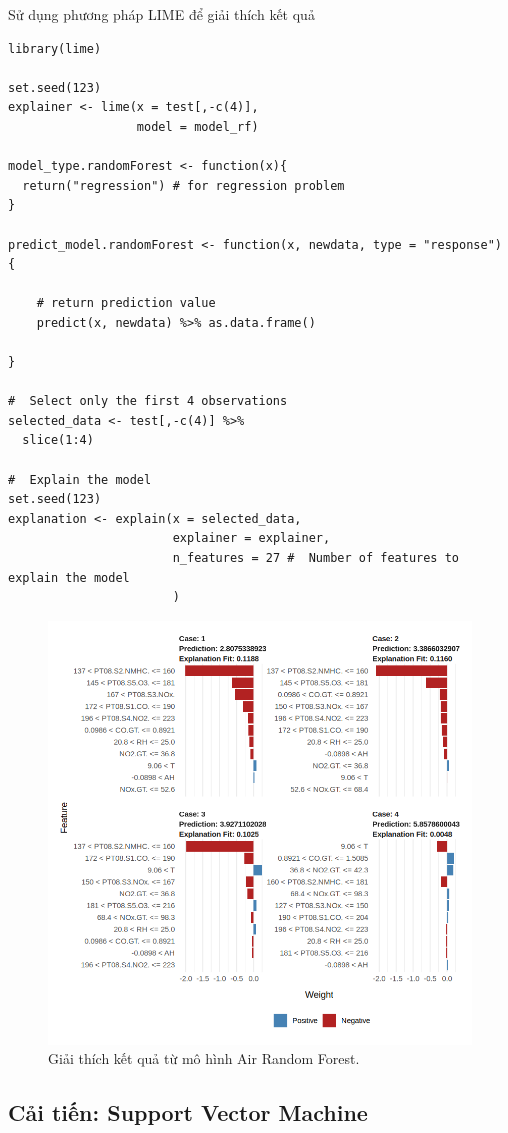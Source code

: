Sử dụng phương pháp LIME để giải thích kết quả
\begin{lstlisting}
library(lime)

set.seed(123)
explainer <- lime(x = test[,-c(4)],
                  model = model_rf)

model_type.randomForest <- function(x){
  return("regression") # for regression problem
}

predict_model.randomForest <- function(x, newdata, type = "response") {

    # return prediction value
    predict(x, newdata) %>% as.data.frame()
    
}

#  Select only the first 4 observations
selected_data <- test[,-c(4)] %>% 
  slice(1:4)

#  Explain the model
set.seed(123)
explanation <- explain(x = selected_data, 
                       explainer = explainer,
                       n_features = 27 #  Number of features to explain the model
                       )
\end{lstlisting}
\begin{figure}[H]
    \centering
    \includegraphics[width=0.75\columnwidth]{air_figures/air_lime_random_forest.png}
    \caption{Giải thích kết quả từ mô hình Air Random Forest.}
    \label{fig:air_lime_random_forest}
\end{figure}

\subsection{Cải tiến: Support Vector Machine}

